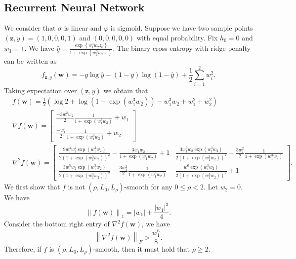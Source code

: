 \documentclass{article}
\newcommand{\Norm}[1]{\left\|#1\right\|}
\newcommand{\paren}[1]{\left( #1 \right)}
\newcommand{\bw}{\mathbf{w}}
\newcommand{\bz}{\mathbf{z}}
\begin{document}
\subsection{Recurrent Neural Network}
We consider that $\sigma$ is linear and $\varphi$ is sigmoid. Suppose we have two sample points $(\bz,y)=(1,0,0,0,1)$ and $(0,0,0,0,0)$ with equal probability. Fix $h_0=0$ and $w_3=1$. We have
$\hat{y}=\frac{\exp\left\{w_1^3w_2z_0\right\}}{1+\exp\left\{w_1^3w_2z_0\right\}}.$
The binary cross entropy with ridge penalty can be written as
$$f_{\bz,y}(\bw)=-y\log\hat{y}-\paren{1-y}\log\paren{1-\hat{y}}+\frac{1}{2}\sum_{i=1}^2w_i^2.$$
Taking expectation over $(\bz,y)$ we obtain that
\begin{equation}\nonumber
    \begin{aligned}
        &f(\bw)=\frac{1}{2}\left(\log 2+\log \left(1+\exp \left(w_1^3 w_2\right)\right)-w_1^3 w_2+w_1^2+w_2^2\right)\\
        &\nabla{f}(\bw)=\left[\begin{array}{c}
\frac{-3 w_1^2 w_2}{2} \frac{1}{1+\exp \left(w_1^3 w_2\right)}+w_1 \\
\frac{-w_1^3}{2} \frac{1}{1+\exp \left(w_1^3 w_2\right)}+w_2
\end{array}\right]\\
        &\nabla^2{f}(\bw)=\left[\begin{array}{cc}
\frac{9 w_1^4 w_2^2 \exp \left(w_1^3 w_2\right)}{2\left(1+\exp \left(w_1^3 w_2\right)\right)^2}-\frac{3 w_1 w_2}{1+\exp \left(w_1^3 w_2\right)}+1 & \frac{3 w_1^5 w_2 \exp \left(w_1^3 w_2\right)}{2\left(1+\exp \left(w_1^3 w_2\right)\right)^2}-\frac{3 w_1^2}{2} \frac{1}{1+\exp \left(w_1^3 w_2\right)} \\
\frac{3 w_1^5 w_2 \exp \left(w_1^3 w_2\right)}{2\left(1+\exp \left(w_1^3 w_2\right)\right)^2}-\frac{3 w_1^2}{2} \frac{1}{1+\exp \left(w_1^3 w_2\right)} & \frac{w_1^6 \exp \left(w_1^3 w_2\right)}{2\left(1+\exp \left(w_1^3 w_2\right)\right)^2}+1
\end{array}\right].
    \end{aligned}
\end{equation}
We first show that $f$ is not $(\rho,L_0,L_\rho)$-smooth for any $0\leq\rho<2$. Let $w_2=0$. We have
$$\Norm{f(\bw)}_1=|w_1|+\frac{|w_1|^3}{4}.$$
Consider the bottom right entry of $\nabla^2 f(\bw)$, we have 
$$\Norm{\nabla^2 f(\bw)}_F>\frac{w_1^6}{8}.$$
Therefore, if $f$ is $(\rho,L_0,L_\rho)$-smooth, then it must hold that $\rho\geq 2$.
\end{document}

